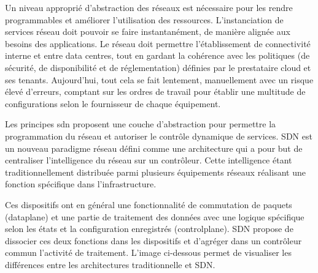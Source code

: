 Un niveau approprié  d'abstraction des réseaux est nécessaire pour les rendre programmables et améliorer l'utilisation des ressources. L’instanciation de services réseau doit pouvoir se faire instantanément, de manière alignée aux besoins des applications. Le réseau doit permettre l'établissement de connectivité interne et entre data centres, tout en gardant la cohérence avec les politiques (de sécurité, de disponibilité et de réglementation) définies par le prestataire cloud et ses tenants. Aujourd'hui, tout cela se fait lentement, manuellement avec un risque élevé d'erreurs, comptant sur les ordres de travail pour établir une  multitude  de configurations selon le fournisseur de chaque équipement.

Les principes \gls{sdn} %
proposent une couche d'abstraction pour permettre la programmation du réseau et autoriser le contrôle dynamique de services. SDN est un nouveau \gls{paradigme} réseau défini comme une architecture qui a pour but de centraliser l'intelligence du réseau sur un contrôleur. Cette intelligence étant traditionnellement distribuée parmi plusieurs équipements réseaux réalisant une fonction spécifique dans l'infrastructure.

Ces dispositifs ont en général une fonctionnalité de commutation de paquets (\gls{dataplane}) et une partie de traitement des données avec une logique spécifique selon les états et la configuration enregistrés (\gls{controlplane}). SDN propose de dissocier ces deux fonctions dans les dispositifs et d'agréger dans un contrôleur commun l'activité de traitement. L'image ci-dessous permet de visualiser les différences entre les architectures traditionnelle et SDN. \\


